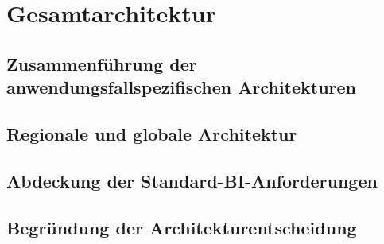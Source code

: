 \section{Gesamtarchitektur}
\label{sec:architekturentscheidung}

\subsection{Zusammenführung der anwendungsfallspezifischen Architekturen}

\subsection{Regionale und globale Architektur}

\subsection{Abdeckung der Standard-BI-Anforderungen}

\subsection{Begründung der Architekturentscheidung}
